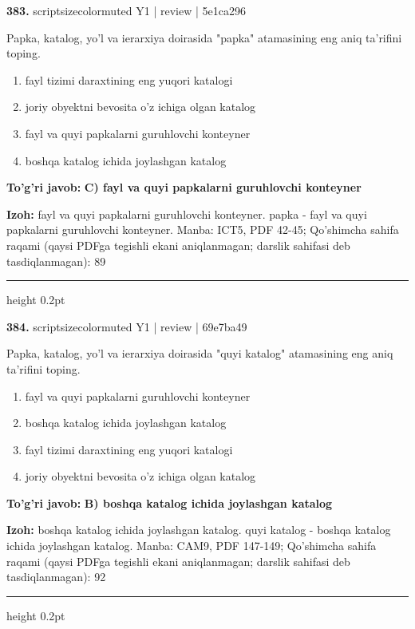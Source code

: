 \documentclass[10pt,a4paper]{article}
\begin{document}
{\bfseries\sffamily\color{ink} 383.} {scriptsizecolor{muted} Y1 | review | 5e1ca296}
\par
Papka, katalog, yo'l va ierarxiya doirasida "papka" atamasining eng aniq ta'rifini toping.
\begin{enumerate}[label=\Alph*),leftmargin=9mm]
\item fayl tizimi daraxtining eng yuqori katalogi
\item joriy obyektni bevosita o'z ichiga olgan katalog
\item fayl va quyi papkalarni guruhlovchi konteyner
\item boshqa katalog ichida joylashgan katalog
\end{enumerate}
\begin{tcolorbox}[enhanced,breakable,colback=teal!4,colframe=teal!60!black,boxrule=0.45pt,arc=1.2mm,left=2.7mm,right=2.7mm,top=1.8mm,bottom=1.8mm,before skip=2mm,after skip=2mm]
{\bfseries\sffamily\color{teal}To'g'ri javob:} \textbf{C) fayl va quyi papkalarni guruhlovchi konteyner}
\par\smallskip
{\bfseries Izoh:} fayl va quyi papkalarni guruhlovchi konteyner. papka - fayl va quyi papkalarni guruhlovchi konteyner. Manba: ICT5, PDF 42-45; Qo'shimcha sahifa raqami (qaysi PDFga tegishli ekani aniqlanmagan; darslik sahifasi deb tasdiqlanmagan): 89
\end{tcolorbox}
\vspace{2mm}\hrule height 0.2pt\vspace{3mm}

{\bfseries\sffamily\color{ink} 384.} {scriptsizecolor{muted} Y1 | review | 69e7ba49}
\par
Papka, katalog, yo'l va ierarxiya doirasida "quyi katalog" atamasining eng aniq ta'rifini toping.
\begin{enumerate}[label=\Alph*),leftmargin=9mm]
\item fayl va quyi papkalarni guruhlovchi konteyner
\item boshqa katalog ichida joylashgan katalog
\item fayl tizimi daraxtining eng yuqori katalogi
\item joriy obyektni bevosita o'z ichiga olgan katalog
\end{enumerate}
\begin{tcolorbox}[enhanced,breakable,colback=teal!4,colframe=teal!60!black,boxrule=0.45pt,arc=1.2mm,left=2.7mm,right=2.7mm,top=1.8mm,bottom=1.8mm,before skip=2mm,after skip=2mm]
{\bfseries\sffamily\color{teal}To'g'ri javob:} \textbf{B) boshqa katalog ichida joylashgan katalog}
\par\smallskip
{\bfseries Izoh:} boshqa katalog ichida joylashgan katalog. quyi katalog - boshqa katalog ichida joylashgan katalog. Manba: CAM9, PDF 147-149; Qo'shimcha sahifa raqami (qaysi PDFga tegishli ekani aniqlanmagan; darslik sahifasi deb tasdiqlanmagan): 92
\end{tcolorbox}
\vspace{2mm}\hrule height 0.2pt\vspace{3mm}
\end{document}
